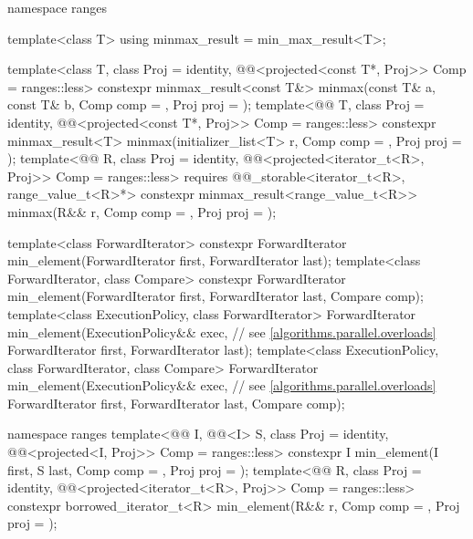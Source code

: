 \begin{codeblock}
{  namespace ranges {
    template<class T>
      using minmax_result = min_max_result<T>;

    template<class T, class Proj = identity,
             @@<projected<const T*, Proj>> Comp = ranges::less>
      constexpr minmax_result<const T&>
        minmax(const T& a, const T& b, Comp comp = {}, Proj proj = {});
    template<@@ T, class Proj = identity,
             @@<projected<const T*, Proj>> Comp = ranges::less>
      constexpr minmax_result<T>
        minmax(initializer_list<T> r, Comp comp = {}, Proj proj = {});
    template<@@ R, class Proj = identity,
             @@<projected<iterator_t<R>, Proj>> Comp = ranges::less>
      requires @@_storable<iterator_t<R>, range_value_t<R>*>
      constexpr minmax_result<range_value_t<R>>
        minmax(R&& r, Comp comp = {}, Proj proj = {});
  }

  template<class ForwardIterator>
    constexpr ForwardIterator min_element(ForwardIterator first, ForwardIterator last);
  template<class ForwardIterator, class Compare>
    constexpr ForwardIterator min_element(ForwardIterator first, ForwardIterator last,
                                          Compare comp);
  template<class ExecutionPolicy, class ForwardIterator>
    ForwardIterator min_element(ExecutionPolicy&& exec,         // see \ref{algorithms.parallel.overloads}
                                ForwardIterator first, ForwardIterator last);
  template<class ExecutionPolicy, class ForwardIterator, class Compare>
    ForwardIterator min_element(ExecutionPolicy&& exec,         // see \ref{algorithms.parallel.overloads}
                                ForwardIterator first, ForwardIterator last,
                                Compare comp);

  namespace ranges {
    template<@@ I, @@<I> S, class Proj = identity,
             @@<projected<I, Proj>> Comp = ranges::less>
      constexpr I min_element(I first, S last, Comp comp = {}, Proj proj = {});
    template<@@ R, class Proj = identity,
             @@<projected<iterator_t<R>, Proj>> Comp = ranges::less>
      constexpr borrowed_iterator_t<R>
        min_element(R&& r, Comp comp = {}, Proj proj = {});
  }

}
\end{codeblock}
